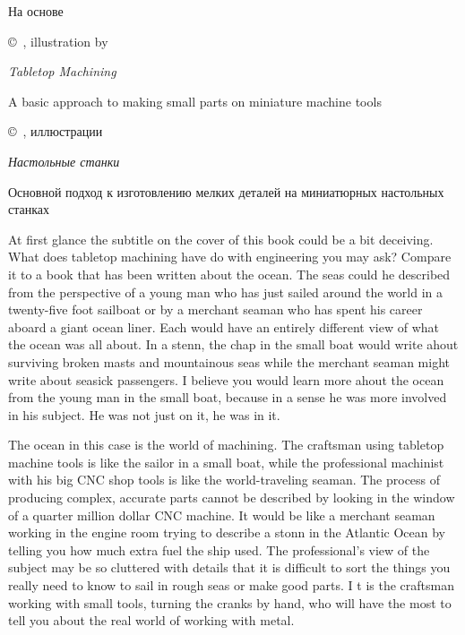 \label{stanki}
\secdown

На основе 

\copyright\ , illustration by 

\emph{Tabletop Machining}

A basic approach to making small parts on miniature machine tools

\bigskip

\copyright\ , иллюстрации  

\emph{Настольные станки}

Основной подход к изготовлению мелких деталей на миниатюрных настольных станках

\clearpage
{}


At first glance the subtitle on the cover of this book
could be a bit deceiving. What does tabletop
machining have do with engineering you may ask?
Compare it to a book that has been written about
the ocean. The seas could he described from the
perspective of a young man who has just sailed
around the world in a twenty-five foot sailboat or
by a merchant seaman who has spent his career
aboard a giant ocean liner. Each would have an
entirely different view of what the ocean was all
about. In a stenn, the chap in the small boat would
write ahout surviving broken masts and
mountainous seas while the merchant seaman might
write about seasick passengers. I believe you would
learn more ahout the ocean from the young man in
the small boat, because in a sense he was more
involved in his subject. He was not just on it, he
was in it.


The ocean in this case is the world of machining.
The craftsman using tabletop machine tools is like
the sailor in a small boat, while the professional
machinist with his big CNC shop tools is like the
world-traveling seaman. The process of producing
complex, accurate parts cannot be described by
looking in the window of a quarter million dollar
CNC machine. It would be like a merchant seaman
working in the engine room trying to describe a
stonn in the Atlantic Ocean by telling you how much
extra fuel the ship used. The professional's view of
the subject may be so cluttered with details that it is
difficult to sort the things you really need to know
to sail in rough seas or make good parts. I t is the
craftsman working with small tools, turning the
cranks by hand, who will have the most to tell you
about the real world of working with metal.

